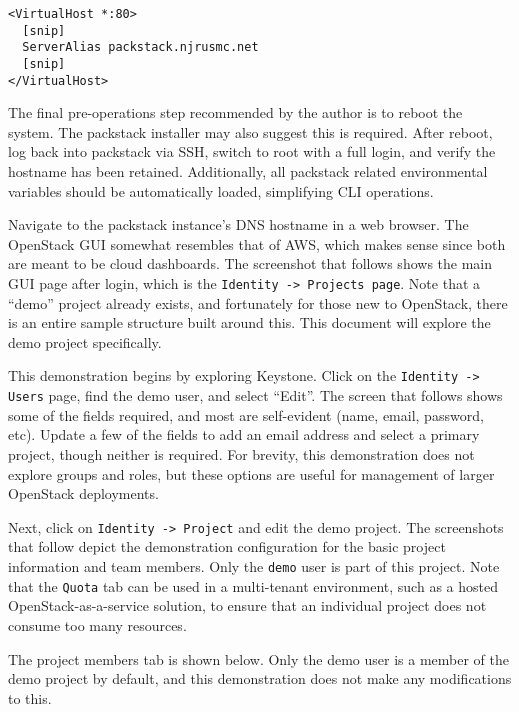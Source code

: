 \begin{verbatim}
<VirtualHost *:80>
  [snip]
  ServerAlias packstack.njrusmc.net
  [snip]
</VirtualHost>
\end{verbatim}

The final pre-operations step recommended by the author is to reboot the
system. The packstack installer may also suggest this is required. After
reboot, log back into packstack via SSH, switch to root with a full login, and
verify the hostname has been retained. Additionally, all packstack related
environmental variables should be automatically loaded, simplifying CLI
operations.

Navigate to the packstack instance’s DNS hostname in a web browser. The
OpenStack GUI somewhat resembles that of AWS, which makes sense since both are
meant to be cloud dashboards. The screenshot that follows shows the main GUI
page after login, which is the \verb|Identity -> Projects page|. Note that a
``demo'' project already exists, and fortunately for those new to OpenStack,
there is an entire sample structure built around this. This document will
explore the demo project specifically.


This demonstration begins by exploring Keystone. Click on the
\verb|Identity -> Users| page, find the demo user, and select ``Edit''. The
screen that follows shows some of the fields required, and most are
self-evident (name, email, password, etc). Update a few of the fields to add
an email address and select a primary project, though neither is required. For
brevity, this demonstration does not explore groups and roles, but these
options are useful for management of larger OpenStack deployments.


Next, click on \verb|Identity -> Project| and edit the demo project. The
screenshots that follow depict the demonstration configuration for
the basic project information and team members. Only the \verb|demo| user is
part of this project. Note that the \verb|Quota| tab can be used in a
multi-tenant environment, such as a hosted OpenStack-as-a-service solution, to
ensure that an individual project does not consume too many resources.


The project members tab is shown below. Only the demo user is a member of the
demo project by default, and this demonstration does not make any
modifications to this.

